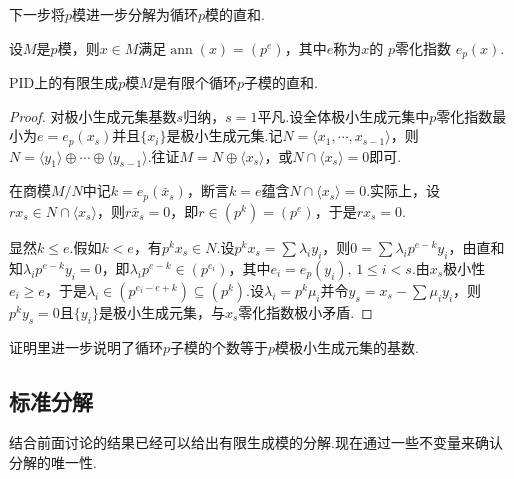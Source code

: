 下一步将$p$模进一步分解为循环$p$模的直和.

设$M$是$p$模，则$x\in M$满足$\operatorname*{ann}(x)=(p^e)$，其中$e$称为$x$的 {\heiti $p$零化指数} $e_p(x)$.
\begin{thm}
    PID上的有限生成$p$模$M$是有限个循环$p$子模的直和.
\end{thm}
\begin{proof}
    对极小生成元集基数$s$归纳，$s=1$平凡.设全体极小生成元集中$p$零化指数最小为$e=e_p(x_s)$并且$\{x_i\}$是极小生成元集.记$N=\langle x_1,\cdots,x_{s-1}\rangle $，则$N=\langle y_1\rangle\oplus\cdots\oplus\langle y_{s-1}\rangle $.往证$M=N\oplus\langle x_s\rangle $，或$N\cap\langle x_s\rangle=0$即可.
    
    在商模$M/N$中记$k=e_p(\bar x_s)$，断言$k=e$蕴含$N\cap\langle x_s\rangle=0$.实际上，设$rx_s\in N\cap\langle x_s\rangle $，则$r\bar x_s=0$，即$r\in(p^k)=(p^e)$，于是$rx_s=0$.

    显然$k\le e$.假如$k<e$，有$p^kx_s\in N$.设$p^kx_s=\sum\lambda_iy_i$，则$0=\sum\lambda_ip^{e-k}y_i$，由直和知$\lambda_ip^{e-k}y_i=0$，即$\lambda_ip^{e-k}\in(p^{e_i})$，其中$e_i=e_p(y_i),\,1\le i<s$.由$x_s$极小性$e_i\ge e$，于是$\lambda_i\in(p^{e_i-e+k})\subseteq(p^k)$.设$\lambda_i=p^k\mu_i$并令$y_s=x_s-\sum\mu_iy_i$，则$p^ky_s=0$且$\{y_i\}$是极小生成元集，与$x_s$零化指数极小矛盾.
\end{proof}
\begin{remark}
    证明里进一步说明了循环$p$子模的个数等于$p$模极小生成元集的基数.
\end{remark}

\subsection{标准分解}
结合前面讨论的结果已经可以给出有限生成模的分解.现在通过一些不变量来确认分解的唯一性.

